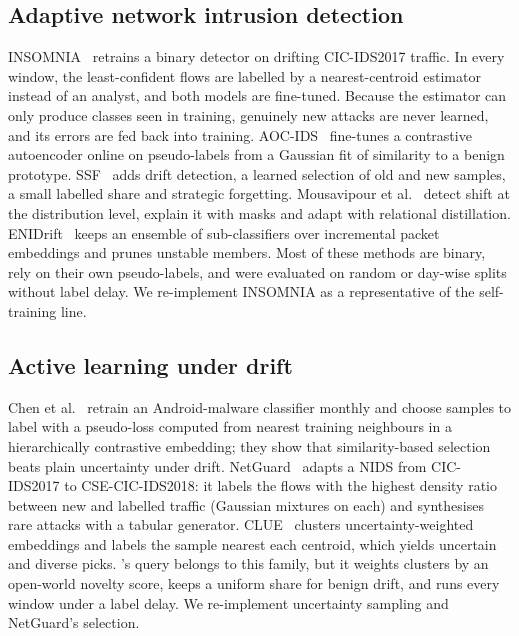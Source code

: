 \subsection{Adaptive network intrusion detection}
INSOMNIA~\cite{andresini2021insomnia} retrains a binary detector on drifting CIC-IDS2017 traffic. In every window,
the least-confident flows are labelled by a nearest-centroid estimator instead of an analyst, and both models are
fine-tuned. Because the estimator can only produce classes seen in training, genuinely new attacks are never
learned, and its errors are fed back into training. AOC-IDS~\cite{zhang2024aoc} fine-tunes a contrastive
autoencoder online on pseudo-labels from a Gaussian fit of similarity to a benign prototype. SSF~\cite{zhang2025ssf}
adds drift detection, a learned selection of old and new samples, a small labelled share and strategic forgetting.
Mousavipour et al.~\cite{mousavipour2025shift} detect shift at the distribution level, explain it with masks and
adapt with relational distillation. ENIDrift~\cite{wang2022enidrift} keeps an ensemble of sub-classifiers over
incremental packet embeddings and prunes unstable members. Most of these methods are binary, rely on their own
pseudo-labels, and were evaluated on random or day-wise splits without label delay. We re-implement INSOMNIA as a
representative of the self-training line.

\subsection{Active learning under drift}
Chen et al.~\cite{chen2023continuous} retrain an Android-malware classifier monthly and choose samples to label
with a pseudo-loss computed from nearest training neighbours in a hierarchically contrastive embedding; they show
that similarity-based selection beats plain uncertainty under drift. NetGuard~\cite{gupta2025netguard} adapts a
NIDS from CIC-IDS2017 to CSE-CIC-IDS2018: it labels the flows with the highest density ratio between new and
labelled traffic (Gaussian mixtures on each) and synthesises rare attacks with a tabular generator.
CLUE~\cite{prabhu2021clue} clusters uncertainty-weighted embeddings and labels the sample nearest each centroid,
which yields uncertain and diverse picks. \nova{}'s query belongs to this family, but it weights clusters by an
open-world novelty score, keeps a uniform share for benign drift, and runs every window under a label delay. We
re-implement uncertainty sampling and NetGuard's selection.

